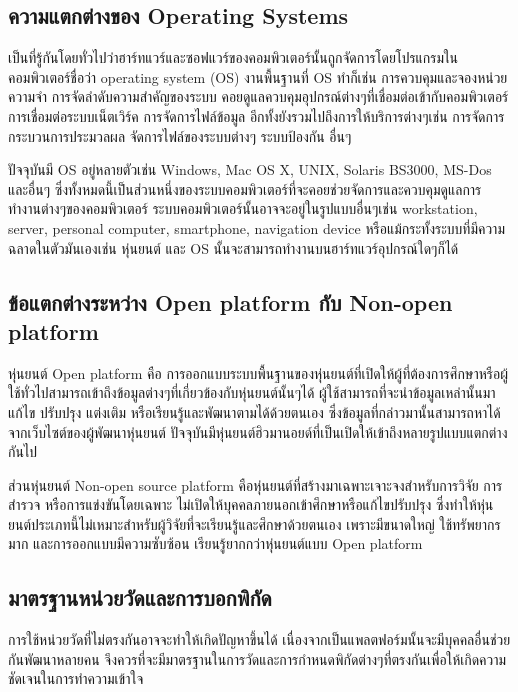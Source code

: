 \subsection{ความแตกต่างของ Operating Systems}

เป็นที่รู้กันโดยทั่วไปว่าฮาร์ทแวร์และซอฟแวร์ของคอมพิวเตอร์นั้นถูกจัดการโดยโปรแกรมในคอมพิวเตอร์ชื่อว่า
operating system (OS) งานพื้นฐานที่ OS ทำก็เช่น การควบคุมและจองหน่วยความจำ
การจัดลำดับความสำคัญของระบบ คอยดูแลควบคุมอุปกรณ์ต่างๆที่เชื่อมต่อเข้ากับคอมพิวเตอร์
การเชื่อมต่อระบบเน็ตเวิร์ค การจัดการไฟล์ข้อมูล อีกทั้งยังรวมไปถึงการให้บริการต่างๆเช่น
การจัดการกระบวนการประมวลผล จัดการไฟล์ของระบบต่างๆ ระบบป้องกัน อื่นๆ

ปัจจุบันมี OS อยู่หลายตัวเช่น Windows, Mac OS X, UNIX, Solaris BS3000, MS-Dos และอื่นๆ
ซึ่งทั้งหมดนี้เป็นส่วนหนึ่งของระบบคอมพิวเตอร์ที่จะคอยช่วยจัดการและควบคุมดูแลการทำงานต่างๆของคอมพิวเตอร์
ระบบคอมพิวเตอร์นั้นอาจจะอยู่ในรูปแบบอื่นๆเช่น workstation, server, personal computer, smartphone,
navigation device หรือแม้กระทั้งระบบที่มีความฉลาดในตัวมันเองเช่น หุ่นยนต์ และ OS
นั้นจะสามารถทำงานบนฮาร์ทแวร์อุปกรณ์ใดๆก็ได้

\subsection{ข้อแตกต่างระหว่าง Open platform กับ Non-open platform}
หุ่นยนต์ Open platform คือ การออกแบบระบบพื้นฐานของหุ่นยนต์ที่เปิดให้ผู้ที่ต้องการศึกษาหรือผู้ใช้ทั่วไปสามารถเข้าถึงข้อมูลต่างๆที่เกี่ยวข้องกับหุ่นยนต์นั้นๆได้
ผู้ใช้สามารถที่จะนำข้อมูลเหล่านั้นมาแก้ไข ปรับปรุง แต่งเติม หรือเรียนรู้และพัฒนาตามได้ด้วยตนเอง 
ซึ่งข้อมูลที่กล่าวมานั้นสามารถหาได้จากเว็บไซต์ของผู้พัฒนาหุ่นยนต์ ปัจจุบันมีหุ่นยนต์ฮิวมานอยด์ที่เป็นเปิดให้เข้าถึงหลายรูปแบบแตกต่างกันไป

ส่วนหุ่นยนต์ Non-open source platform คือหุ่นยนต์ที่สร้างมาเฉพาะเจาะจงสำหรับการวิจัย การสำรวจ หรือการแข่งขันโดยเฉพาะ
ไม่เปิดให้บุคคลภายนอกเข้าศึกษาหรือแก้ไขปรับปรุง ซึ่งทำให้หุ่นยนต์ประเภทนี้ไม่เหมาะสำหรับผู้วิจัยที่จะเรียนรู้และศึกษาด้วยตนเอง เพราะมีขนาดใหญ่
ใช้ทรัพยากรมาก และการออกแบบมีความซับซ้อน เรียนรู้ยากกว่าหุ่นยนต์แบบ Open platform

\subsection{มาตรฐานหน่วยวัดและการบอกพิกัด}
การใช้หน่วยวัดที่ไม่ตรงกันอาจจะทำให้เกิดปัญหาขึ้นได้ เนื่องจากเป็นแพลตฟอร์มนั้นจะมีบุคคลอื่นช่วยกันพัฒนาหลายคน
จึงควรที่จะมีมาตรฐานในการวัดและการกำหนดพิกัดต่างๆที่ตรงกันเพื่อให้เกิดความชัดเจนในการทำความเข้าใจ

